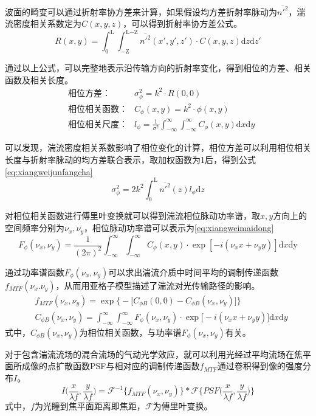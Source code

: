 波面的畸变可以通过折射率协方差来计算，如果假设均方差折射率脉动为$\overline{n'^2}$，湍流密度相关系数定为$C(x,y,z)$，可以得到折射率协方差公式。
\begin{equation}
R(x,y)=\int_0^\text{L}\int_{-\text{Z}}^{\text{L}-\text{Z}}\overline{n'^2}(x',y',z')\cdot C(x,y,z)\text{d}z\text{d}z'
\label{eq:zheshelvxiefangcha}
\end{equation}

通过以上公式，可以完整地表示沿传输方向的折射率变化，得到相位的方差、相关函数及相关长度。
\begin{align}
&\text{相位方差：}&\sigma_\phi^2=k^2\cdot R(0,0)\label{eq:xiangweifangcha} \\
&\text{相位相关函数：}&C_\phi(x,y)=k^2\cdot\phi(x,y) \\
&\text{相位相关尺度：}&l_\phi=\frac{1}{\sigma^2}\int_{-\infty}^{\infty}\int_{-\infty}^{\infty}C_\phi(x,y)\text{d}x\text{d}y \label{eq:xiangweixiangguanchangdu}
\end{align}

可以发现，湍流密度相关系数影响了相位变化的计算，相位方差可以利用相位相关长度与折射率脉动的均方差联合表示，取加权函数为1后，得到公式\eqref{eq:xiangweijunfangcha}
\begin{equation}
\sigma_\phi^2=2k^2\int_0^\text{L}\overline{n'^2}(z)l_\phi\text{d}z
\label{eq:xiangweijunfangcha}
\end{equation}

对相位相关函数进行傅里叶变换就可以得到湍流相位脉动功率谱，取$x,y$方向上的空间频率分别为$\nu_x,\nu_y$，相位脉动功率谱可以表示为\eqref{eq:xiangweimaidong}
\begin{equation}
F_\phi(\nu_x,\nu_y)=\frac{1}{(2\pi)^2}\int_{-\infty}^{\infty}\int_{-\infty}^{\infty}C_\phi(x,y)\cdot\exp[-i(\nu_xx+\nu_yy)]\text{d}x\text{dy}
\label{eq:xiangweimaidong}
\end{equation}

通过功率谱函数$F_\phi(\nu_x,\nu_y)$可以求出湍流介质中时间平均的调制传递函数$f_{MTF}(\nu_x.\nu_y)$，从而用亚格子模型描述了湍流对光传输路径的影响。
\begin{align}
&f_{MTF}(\nu_x,\nu_y)=\exp\big\{-\big[C_{\phi B}(0,0)-C_{\phi B}(\nu_x,\nu_y)\big]\big\}\\
&C_{\phi B}(\nu_x,\nu_y)=\int_{-\infty}^{\infty}\int_{-\infty}^{\infty}F_\phi(\nu_x,\nu_y)\cdot\exp\big[-i(\nu_xx+\nu_yy)\big]\text{d}x\text{d}y
\end{align}
式中，$C_{\phi B}(\nu_x,\nu_y)$为相位相关函数，与功率谱$F_\phi(\nu_x,\nu_y)$有关。

对于包含湍流流场的混合流场的气动光学效应，就可以利用光经过平均流场在焦平面所成像的点扩散函数PSF与相对应的调制传递函数$f_{MTF}$通过卷积得到像的强度分布$I$。
\begin{equation}
I\Big(\frac{x}{\lambda f},\frac{y}{\lambda f}\Big)=\mathscr{F}^{-1}\big\{f_{MTF}(\nu_x,\nu_y)\big\}*\mathscr{F}\Big\{PSF\big(\frac{x}{\lambda f},\frac{y}{\lambda f}\big)\Big\}
\end{equation}
式中，$f$为光瞳到焦平面距离即焦距，$\mathscr{F}$为傅里叶变换。

